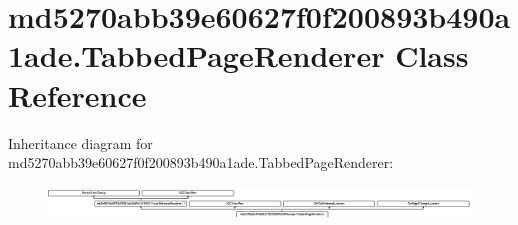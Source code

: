 \hypertarget{classmd5270abb39e60627f0f200893b490a1ade_1_1TabbedPageRenderer}{}\section{md5270abb39e60627f0f200893b490a1ade.\+Tabbed\+Page\+Renderer Class Reference}
\label{classmd5270abb39e60627f0f200893b490a1ade_1_1TabbedPageRenderer}
Inheritance diagram for md5270abb39e60627f0f200893b490a1ade.\+Tabbed\+Page\+Renderer\+:\begin{figure}[H]
\begin{center}
\leavevmode
\includegraphics[height=0.842105cm]{classmd5270abb39e60627f0f200893b490a1ade_1_1TabbedPageRenderer}
\end{center}
\end{figure}
